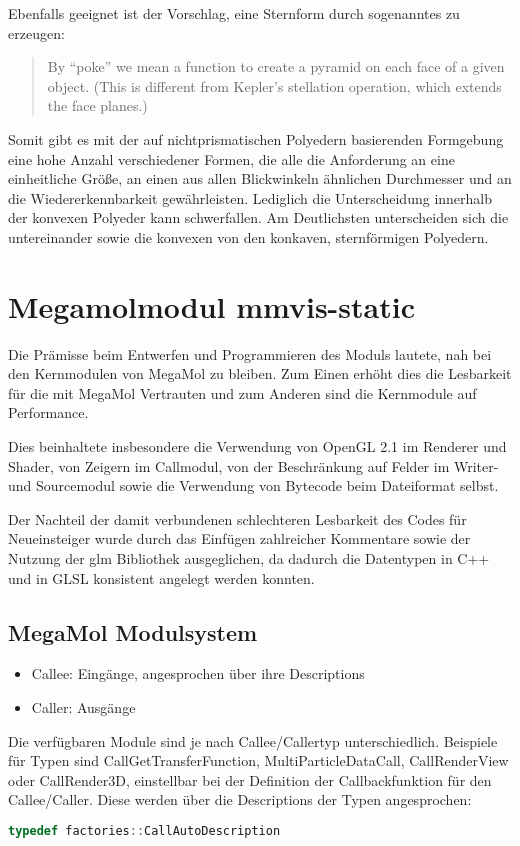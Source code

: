 Ebenfalls geeignet ist der Vorschlag, eine Sternform durch sogenanntes  zu erzeugen: \blockcquote[4]{ProceduralGenerationofSculpturalForms}{By “poke” we mean a function to create a pyramid on each face of a given object. (This is different from Kepler’s stellation operation, which extends the face planes.)}

Somit gibt es mit der auf nichtprismatischen Polyedern basierenden Formgebung eine hohe Anzahl verschiedener Formen, die alle die Anforderung an eine einheitliche Größe, an einen aus allen Blickwinkeln ähnlichen Durchmesser und an die Wiedererkennbarkeit gewährleisten. Lediglich die Unterscheidung innerhalb der konvexen Polyeder kann schwerfallen. Am Deutlichsten unterscheiden sich die  untereinander sowie die konvexen von den konkaven, sternförmigen Polyedern.

\chapter{Megamolmodul mmvis-static}

Die Prämisse beim Entwerfen und Programmieren des Moduls lautete, nah bei den Kernmodulen von MegaMol zu bleiben. Zum Einen erhöht dies die Lesbarkeit für die mit MegaMol Vertrauten und zum Anderen sind die Kernmodule auf Performance.

Dies beinhaltete insbesondere die Verwendung von OpenGL 2.1 im Renderer und Shader, von Zeigern im Callmodul, von der Beschränkung auf Felder im Writer- und Sourcemodul sowie die Verwendung von Bytecode beim Dateiformat selbst.

Der Nachteil der damit verbundenen schlechteren Lesbarkeit des Codes für Neueinsteiger wurde durch das Einfügen zahlreicher Kommentare sowie der Nutzung der glm Bibliothek ausgeglichen, da dadurch die Datentypen in C++ und in GLSL konsistent angelegt werden konnten.

\section{MegaMol Modulsystem}
\begin{itemize}
	\item Callee: Eingänge, angesprochen über ihre Descriptions
	\item Caller: Ausgänge
\end{itemize}

Die verfügbaren Module sind je nach Callee/Callertyp unterschiedlich. Beispiele für Typen sind CallGetTransferFunction, MultiParticleDataCall, CallRenderView oder CallRender3D, einstellbar bei der Definition der Callbackfunktion für den Callee/Caller. Diese werden über die Descriptions der Typen angesprochen:
\begin{lstlisting}[language=c]
typedef factories::CallAutoDescription
\end{lstlisting}

